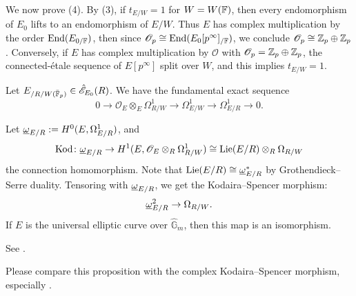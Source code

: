 \documentclass[twoside]{article}
\begin{document}
    We now prove (4). By (3), if $t_{E/W}=1$ for $W=W(\mathbb{F})$,
    then every endomorphism of $E_{0}$ lifts to an endomorphism of $E/W$.
    Thus $E$ has complex multiplication by the order $\operatorname{End}(E_{0/\mathbb{F}})$,
    then since $\mathscr{O}_{p}\cong \operatorname{End}(E_{0}[p^{\infty}]_{/\mathbb{F}})$,
    we conclude $\mathscr{O}_{p}\cong \mathbb{Z}_{p} \oplus \mathbb{Z}_{p}$.
    Conversely, if $E$ has complex multiplication by $\mathscr{O}$
    with $\mathscr{O}_{p}=\mathbb{Z}_{p}\oplus \mathbb{Z}_{p}$,
    the connected-\'etale sequence of $E[p^{\infty}]$ split over $W$,
    and this implies $t_{E/W}=1$.
\epf

Let $E_{/R/W(\bar{\mathbb{F}}_{p})}\in \hat{\mathscr{E}}_{E_{0}}(R)$.
We have the fundamental exact sequence 
\[ 0\to \mathscr{O}_{E}\otimes_{E}\Omega^{1}_{R/W}\to \Omega^{1}_{E/W}\to \Omega^{1}_{E/R}\to 0. \]

\begin{proposition}
    Let $\underline{\omega}_{E/R}:=H^{0}(E,\Omega^{1}_{E/R})$, and 
    \[ \mathrm{Kod}\colon  \underline{\omega}_{E/R} 
        \to H^{1}(E,\mathscr{O}_{E}\otimes_{R}\Omega^{1}_{R/W})
        \cong \operatorname{Lie}(E/R)\otimes_{R}\Omega_{R/W} \]
    the connection homomorphism. 
    Note that $\operatorname{Lie}(E/R)\cong \underline{\omega}_{E/R}^{*}$ 
    by Grothendieck--Serre duality.
    Tensoring with $\underline{\omega}_{E/R}$,
    we get the Kodaira--Spencer morphism:
    \[ \underline{\omega}^{2}_{E/R}\to \Omega_{R/W}. \]
    If $E$ is the universal elliptic curve over $\hat{\mathbb{G}}_{m}$,
    then this map is an isomorphism.
\end{proposition}

\pf
    See \cite[Theorem~4.4.1]{Katz}.
\epf

\begin{remark}
    Please compare this proposition 
    with the complex Kodaira--Spencer morphism,
    especially \cite[Theorem~6.2.12]{Huybrechts}.
\end{remark}

\printbibliography
\end{document}
